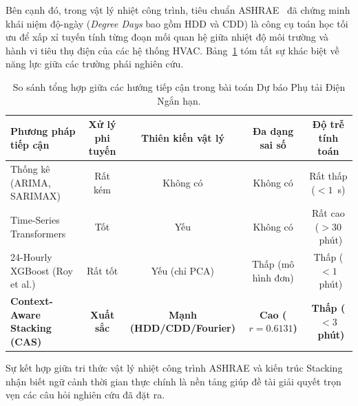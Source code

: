 Bên cạnh đó, trong vật lý nhiệt công trình, tiêu chuẩn ASHRAE~\cite{ashrae2021fundamentals} đã chứng minh khái niệm độ-ngày (\textit{Degree Days} bao gồm HDD và CDD) là công cụ toán học tối ưu để xấp xỉ tuyến tính từng đoạn mối quan hệ giữa nhiệt độ môi trường và hành vi tiêu thụ điện của các hệ thống HVAC. Bảng~\ref{tab:related_work_comparison} tóm tắt sự khác biệt về năng lực giữa các trường phái nghiên cứu.

\begin{table}[htbp]
    \centering
    \small
    \caption{So sánh tổng hợp giữa các hướng tiếp cận trong bài toán Dự báo Phụ tải Điện Ngắn hạn.}
    \label{tab:related_work_comparison}
    \begin{tabularx}{\textwidth}{lcccc}
        \toprule
        \textbf{Phương pháp tiếp cận} & \textbf{Xử lý phi tuyến} & \textbf{Thiên kiến vật lý} & \textbf{Đa dạng sai số} & \textbf{Độ trễ tính toán} \\
        \midrule
        Thống kê (ARIMA, SARIMAX) & Rất kém & Không có & Không có & Rất thấp ($< 1$~s) \\
        Time-Series Transformers & Tốt & Yếu & Không có & Rất cao ($> 30$~phút) \\
        24-Hourly XGBoost (Roy et al.) & Rất tốt & Yếu (chỉ PCA) & Thấp (mô hình đơn) & Thấp ($< 1$~phút) \\
        \textbf{Context-Aware Stacking (CAS)} & \textbf{Xuất sắc} & \textbf{Mạnh (HDD/CDD/Fourier)} & \textbf{Cao ($r = 0.6131$)} & \textbf{Thấp ($< 3$~phút)} \\
        \bottomrule
    \end{tabularx}
\end{table}

Sự kết hợp giữa tri thức vật lý nhiệt công trình ASHRAE và kiến trúc Stacking nhận biết ngữ cảnh thời gian thực chính là nền tảng giúp đề tài giải quyết trọn vẹn các câu hỏi nghiên cứu đã đặt ra.

